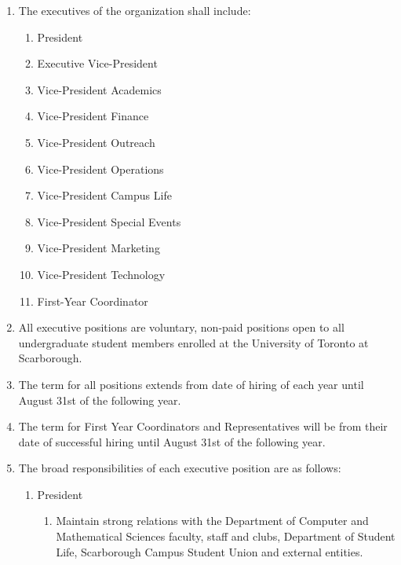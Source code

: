 \documentclass[12pt,a4paper]{article}
\begin{document}
\begin{enumerate}
\item The executives of the organization shall include:

\begin{enumerate}
\item President

\item Executive Vice-President

\item Vice-President Academics

\item Vice-President Finance

\item Vice-President Outreach

\item Vice-President Operations

\item Vice-President Campus Life

\item Vice-President Special Events

\item Vice-President Marketing

\item Vice-President Technology

\item First-Year Coordinator
\end{enumerate}

\item All executive positions are voluntary, non-paid positions open to all undergraduate student members enrolled at the University of Toronto at Scarborough.

\item The term for all positions extends from date of hiring of each year until August 31st of the following year.

\item The term for First Year Coordinators and Representatives will be from their date of successful hiring until August 31st of the following year.

\item The broad responsibilities of each executive position are as follows:

\begin{enumerate}
\item President

\begin{enumerate}
\item Maintain strong relations with the Department of Computer and Mathematical Sciences faculty, staff and clubs, Department of Student Life, Scarborough Campus Student Union and external entities.


\end{enumerate}
\end{enumerate}
\end{enumerate}
\end{document}
